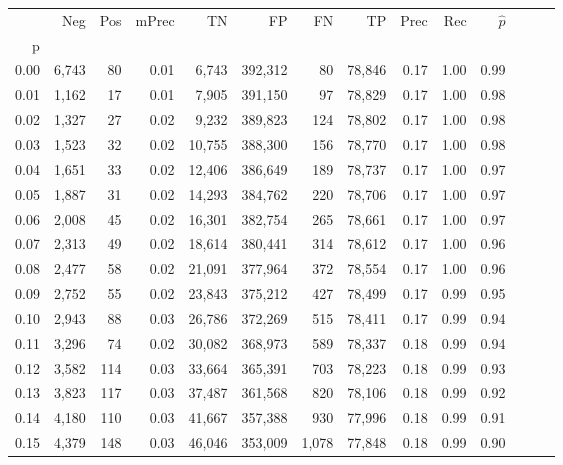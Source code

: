 \begin{tabular}{rrrrrrrrrrrrrr}
\toprule
{} &    Neg &    Pos & mPrec &       TN &       FP &      FN &      TP &  Prec &   Rec & $\hat{p}$ \\
p    &        &        &       &          &          &         &         &       &       &           \\
\midrule
0.00 &  6,743 &     80 &  0.01 &    6,743 &  392,312 &      80 &  78,846 &  0.17 &  1.00 &      0.99 \\
0.01 &  1,162 &     17 &  0.01 &    7,905 &  391,150 &      97 &  78,829 &  0.17 &  1.00 &      0.98 \\
0.02 &  1,327 &     27 &  0.02 &    9,232 &  389,823 &     124 &  78,802 &  0.17 &  1.00 &      0.98 \\
0.03 &  1,523 &     32 &  0.02 &   10,755 &  388,300 &     156 &  78,770 &  0.17 &  1.00 &      0.98 \\
0.04 &  1,651 &     33 &  0.02 &   12,406 &  386,649 &     189 &  78,737 &  0.17 &  1.00 &      0.97 \\
0.05 &  1,887 &     31 &  0.02 &   14,293 &  384,762 &     220 &  78,706 &  0.17 &  1.00 &      0.97 \\
0.06 &  2,008 &     45 &  0.02 &   16,301 &  382,754 &     265 &  78,661 &  0.17 &  1.00 &      0.97 \\
0.07 &  2,313 &     49 &  0.02 &   18,614 &  380,441 &     314 &  78,612 &  0.17 &  1.00 &      0.96 \\
0.08 &  2,477 &     58 &  0.02 &   21,091 &  377,964 &     372 &  78,554 &  0.17 &  1.00 &      0.96 \\
0.09 &  2,752 &     55 &  0.02 &   23,843 &  375,212 &     427 &  78,499 &  0.17 &  0.99 &      0.95 \\
0.10 &  2,943 &     88 &  0.03 &   26,786 &  372,269 &     515 &  78,411 &  0.17 &  0.99 &      0.94 \\
0.11 &  3,296 &     74 &  0.02 &   30,082 &  368,973 &     589 &  78,337 &  0.18 &  0.99 &      0.94 \\
0.12 &  3,582 &    114 &  0.03 &   33,664 &  365,391 &     703 &  78,223 &  0.18 &  0.99 &      0.93 \\
0.13 &  3,823 &    117 &  0.03 &   37,487 &  361,568 &     820 &  78,106 &  0.18 &  0.99 &      0.92 \\
0.14 &  4,180 &    110 &  0.03 &   41,667 &  357,388 &     930 &  77,996 &  0.18 &  0.99 &      0.91 \\
0.15 &  4,379 &    148 &  0.03 &   46,046 &  353,009 &   1,078 &  77,848 &  0.18 &  0.99 &      0.90 \\

\end{tabular}
